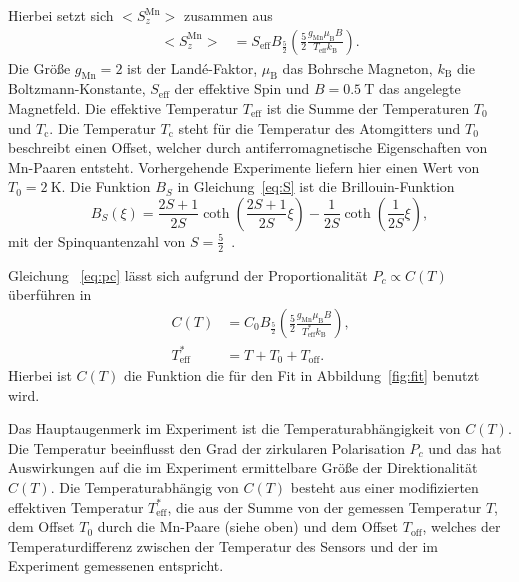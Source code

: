 Hierbei setzt sich $\bigl< S^\text{Mn}_{z} \bigr>$ zusammen aus~\cite{nature} 
\begin{align}
    \label{eq:S}
    \bigl< S^\text{Mn}_{z} \bigr> &= S_\text{eff} B_\text{$\frac{5}{2}$} \left(\frac{5}{2}\frac{g_\text{Mn} \mu_\text{B} B }{T_\text{eff} k_\text{B}} \right)\text{.}
\end{align}
Die Größe $g_\text{Mn} = 2 $ ist der Landé-Faktor, $\mu_\text{B}$ das Bohrsche Magneton,
$k_\text{B}$ die Boltzmann-Konstante, $S_\text{eff}$ der effektive Spin und $B=\SI{0,5}{\tesla} $ das angelegte Magnetfeld.
Die effektive Temperatur $T_\text{eff}$ ist die Summe der Temperaturen $T_0$ und $T_\text{c}$.
Die Temperatur $T_\text{c}$
steht für die Temperatur des Atomgitters und $T_0$ beschreibt einen Offset, welcher durch antiferromagnetische Eigenschaften
von Mn-Paaren entsteht. Vorhergehende Experimente liefern hier einen Wert von $T_0=\SI{2}{\kelvin}$.
Die Funktion $B_{S}$ in Gleichung~\ref{eq:S} ist die Brillouin-Funktion  
\begin{equation}
    B_{S}(\xi) = \frac{2S+1}{2S}\coth\left(\frac{2S+1}{2S}\xi\right) - \frac{1}{2S}\coth(\frac{1}{2S}\xi),
\end{equation}
mit der Spinquantenzahl von $ S = \frac{5}{2}$~\cite{felix}.

Gleichung ~\ref{eq:pc} lässt sich aufgrund der Proportionalität $P_{c} \propto C(T)$~\cite{nature} 
überführen in
\begin{align}
    \label{eq:C}
    C(T)&= C_0 B_\text{$\frac{5}{2}$} \left( \frac{5}{2}\frac{g_\text{Mn} \mu_\text{B} B }{T^*_\text{eff} k_\text{B}}\right)\text{,} \\
    T^*_\text{eff} &= T + T_0 + T_\text{off}\text{.}
\end{align}
Hierbei ist $C(T)$ die Funktion die für den Fit in Abbildung~\ref{fig:fit} benutzt wird.
%

Das Hauptaugenmerk im Experiment ist die Temperaturabhängigkeit von $C(T)$.
Die Temperatur beeinflusst den Grad der zirkularen Polarisation $P_c$ und das hat 
Auswirkungen auf die im Experiment ermittelbare Größe der Direktionalität $C(T)$. 
Die Temperaturabhängig von $C(T)$ besteht aus
einer modifizierten effektiven Temperatur $T^*_\text{eff}$, die aus der Summe von der gemessen Temperatur $T$, dem 
Offset $T_0$ durch die Mn-Paare (siehe oben) und dem Offset $T_\text{off}$, welches
der Temperaturdifferenz zwischen der Temperatur des Sensors und der im Experiment gemessenen entspricht. 

